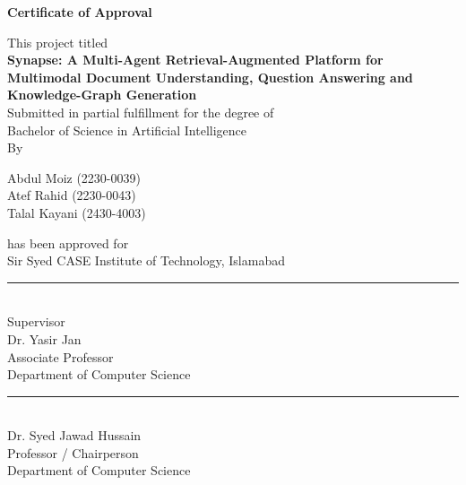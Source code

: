 \clearpage
\thispagestyle{plain}
\begin{center}
{\fontsize{16}{20}\bfseries Certificate of Approval\par}
\end{center}
\vspace{0.3in}

\begin{center}
This project titled\\[6pt]
\textbf{Synapse: A Multi-Agent Retrieval-Augmented Platform for Multimodal Document
Understanding, Question Answering and Knowledge-Graph Generation}\\[6pt]
Submitted in partial fulfillment for the degree of\\[4pt]
Bachelor of Science in Artificial Intelligence\\[6pt]
By
\end{center}

\vspace{6pt}
\begin{center}
Abdul Moiz \quad (2230-0039)\\[3pt]
Atef Rahid \quad (2230-0043)\\[3pt]
Talal Kayani \quad (2430-4003)
\end{center}

\vspace{8pt}
\begin{center}
has been approved for\\[4pt]
Sir Syed CASE Institute of Technology, Islamabad
\end{center}

\vspace{0.6in}
\noindent\rule{2.6in}{0.4pt}\\
Supervisor\\
Dr. Yasir Jan\\
Associate Professor\\
Department of Computer Science

\vspace{0.6in}
\noindent\rule{2.6in}{0.4pt}\\
Dr. Syed Jawad Hussain\\
Professor / Chairperson\\
Department of Computer Science
